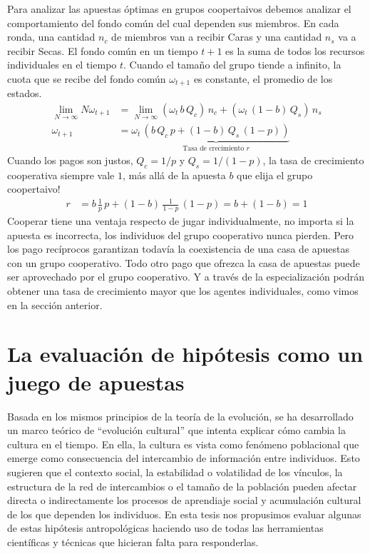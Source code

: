 \documentclass[a4paper,10pt]{book}
\theoremstyle{definition}
\begin{document}
Para analizar las apuestas \'optimas en grupos coopertaivos debemos analizar el comportamiento del fondo común del cual dependen sus miembros.
%
En cada ronda, una cantidad $n_c$ de miembros van a recibir Caras y una cantidad $n_s$ va a recibir Secas.
%
El fondo común en un tiempo $t+1$ es la suma de todos los recursos individuales en el tiempo $t$.
%
Cuando el tama\~no del grupo tiende a infinito, la cuota que se recibe del fondo común $\omega_{t+1}$ es constante, el promedio de los estados.
%
\begin{equation}
\begin{split}
\lim_{N \rightarrow \infty} N \omega_{t+1} &= \lim_{N \rightarrow \infty} (\omega_t \, b \, Q_c ) \, n_c + (\omega_t \, (1-b) \, Q_s ) \, n_s \\
 \omega_{t+1} &=  \omega_t \, \underbrace{\left(  b \, Q_c \, p +  (1-b) \, Q_s \, (1-p) \right)}_{\text{Tasa de crecimiento } r} 
\end{split}
\end{equation}
%
Cuando los pagos son justos, $Q_c = 1/p$ y $Q_s = 1/(1-p)$, la tasa de crecimiento cooperativa siempre vale $1$, m\'as all\'a de la apuesta $b$ que elija el grupo coopertaivo!
%
\begin{equation}
\begin{split}
r &=  b \, \frac{1}{p} \, p +  (1-b) \, \frac{1}{1-p} \, (1-p) = b + (1 - b) = 1
\end{split}
\end{equation}
%
Cooperar tiene una ventaja respecto de jugar individualmente, no importa si la apuesta es incorrecta, los individuos del grupo cooperativo nunca pierden.
%
Pero los pago rec\'iprocos garantizan todav\'ia la coexistencia de una casa de apuestas con un grupo cooperativo.
%
Todo otro pago que ofrezca la casa de apuestas puede ser aprovechado por el grupo cooperativo.
%
Y a trav\'es de la especializaci\'on podr\'an obtener una tasa de crecimiento mayor que los agentes individuales, como vimos en la secci\'on anterior.

\section{La evaluaci\'on de hip\'otesis como un juego de apuestas}

Basada en los mismos principios de la teor\'ia de la evoluci\'on, se ha desarrollado un marco te\'orico de ``evoluci\'on cultural'' que intenta explicar c\'omo cambia la cultura en el tiempo.
%
En ella, la cultura es vista como fen\'omeno poblacional que emerge como consecuencia del intercambio de informaci\'on entre individuos.
%
Esto sugieren que el contexto social, la estabilidad o volatilidad de los v\'inculos, la estructura de la red de intercambios o el tama\~no de la poblaci\'on pueden afectar directa o indirectamente los procesos de aprendiaje social y acumulaci\'on cultural de los que dependen los individuos.
%
En esta tesis nos propusimos evaluar algunas de estas hip\'otesis antropol\'ogicas haciendo uso de todas las herramientas cient\'ificas y t\'ecnicas que hicieran falta para responderlas.
\end{document}
